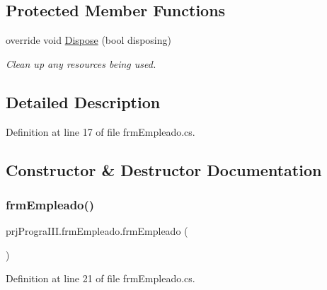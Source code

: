 \subsection*{Protected Member Functions}
\begin{DoxyCompactItemize}
\item 
override void \hyperlink{classprj_progra_i_i_i_1_1frm_empleado_a4c45e76c6fe661b6cb37bcacbaedff9a}{Dispose} (bool disposing)
\begin{DoxyCompactList}\small\item\em Clean up any resources being used. \end{DoxyCompactList}\end{DoxyCompactItemize}


\subsection{Detailed Description}


Definition at line 17 of file frm\+Empleado.\+cs.



\subsection{Constructor \& Destructor Documentation}
\hypertarget{classprj_progra_i_i_i_1_1frm_empleado_a8e98a0755332ce950f8f863b4c364398}{}\label{classprj_progra_i_i_i_1_1frm_empleado_a8e98a0755332ce950f8f863b4c364398} 
\subsubsection{\texorpdfstring{frm\+Empleado()}{frmEmpleado()}}
{\footnotesize\ttfamily prj\+Progra\+I\+I\+I.\+frm\+Empleado.\+frm\+Empleado (\begin{DoxyParamCaption}{ }\end{DoxyParamCaption})}



Definition at line 21 of file frm\+Empleado.\+cs.


